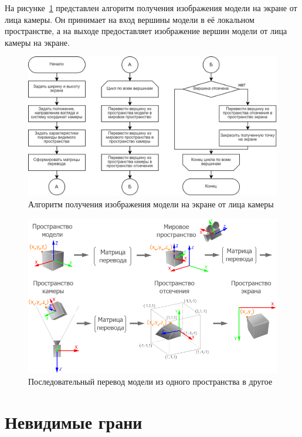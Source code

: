 На рисунке~\ref{fig:camera-image} представлен алгоритм получения изображения модели на экране от лица камеры. Он принимает на вход вершины модели в её локальном пространстве, а на выходе предоставляет изображение вершин модели от лица камеры на экране.
\begin{figure}[h] 
	\centering
	\includegraphics[width=1\textwidth]{images/camera-image.png}
	\caption{Алгоритм получения изображения модели на экране от лица камеры} 
	\label{fig:camera-image} 
\end{figure}
\begin{figure}[h] 
	\centering
	\includegraphics[width=1\textwidth]{images/space_transformations.png}
	\caption{Последовательный перевод модели из одного пространства в другое} 
	\label{fig:space-transformations} 
\end{figure}

\clearpage

\section{Невидимые грани}

